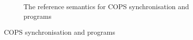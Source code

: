 \begin{figure}
\begin{subfigure}{\textwidth}
\caption{The reference semantics for COPS synchronisation and programs}
\label{fig:cops-semantics-program}

\end{subfigure}

\hrulefill

\caption{COPS synchronisation and programs}

\end{figure}

